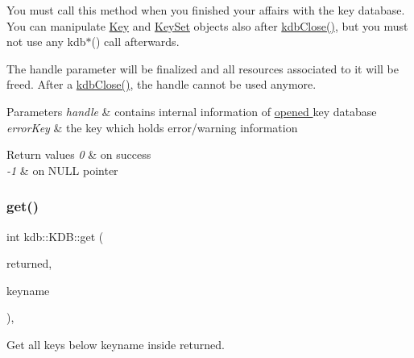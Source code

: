 You must call this method when you finished your affairs with the key database. You can manipulate \hyperlink{classkdb_1_1Key}{Key} and \hyperlink{classkdb_1_1KeySet}{Key\+Set} objects also after \hyperlink{group__kdb_gadb54dc9fda17ee07deb9444df745c96f}{kdb\+Close()}, but you must not use any kdb$\ast$() call afterwards.

The {\ttfamily handle} parameter will be finalized and all resources associated to it will be freed. After a \hyperlink{group__kdb_gadb54dc9fda17ee07deb9444df745c96f}{kdb\+Close()}, the {\ttfamily handle} cannot be used anymore.


\begin{DoxyParams}{Parameters}
{\em handle} & contains internal information of \hyperlink{group__kdb_ga6808defe5870f328dd17910aacbdc6ca}{opened } key database \\
\hline
{\em error\+Key} & the key which holds error/warning information \\
\hline
\end{DoxyParams}

\begin{DoxyRetVals}{Return values}
{\em 0} & on success \\
\hline
{\em -\/1} & on N\+U\+LL pointer \\
\hline
\end{DoxyRetVals}
\mbox{\label{classkdb_1_1KDB_a0419ffbc273c89756bc523b4223ec25a}} 
\subsubsection{\texorpdfstring{get()}{get()}\hspace{0.1cm}{\footnotesize\ttfamily [1/2]}}
{\footnotesize\ttfamily int kdb\+::\+K\+D\+B\+::get (\begin{DoxyParamCaption}\item[{\hyperlink{classkdb_1_1KeySet}{Key\+Set} \&}]{returned,  }\item[{std\+::string const \&}]{keyname }\end{DoxyParamCaption})\hspace{0.3cm}{\ttfamily [inline]}, {\ttfamily [virtual]}}



Get all keys below keyname inside returned. 


